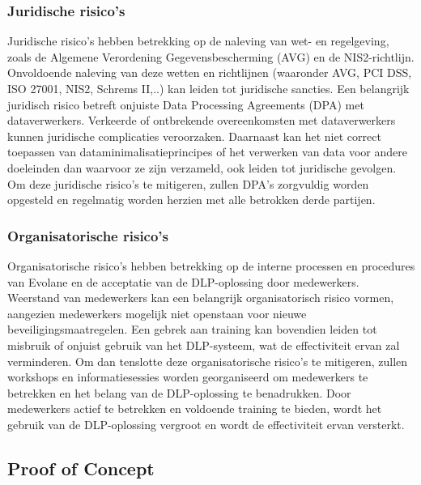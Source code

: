 \subsubsection{Juridische risico's}

Juridische risico's hebben betrekking op de naleving van wet- en regelgeving, zoals de Algemene Verordening Gegevensbescherming (AVG) en de NIS2-richtlijn.
Onvoldoende naleving van deze wetten en richtlijnen (waaronder AVG, PCI DSS, ISO 27001, NIS2, Schrems II,..) kan leiden tot juridische sancties. 
Een belangrijk juridisch risico betreft onjuiste Data Processing Agreements (DPA) met dataverwerkers. 
Verkeerde of ontbrekende overeenkomsten met dataverwerkers kunnen juridische complicaties veroorzaken. 
Daarnaast kan het niet correct toepassen van dataminimalisatieprincipes of het verwerken van data voor andere doeleinden dan waarvoor ze zijn verzameld, 
ook leiden tot juridische gevolgen. 
Om deze juridische risico's te mitigeren, zullen DPA's zorgvuldig worden opgesteld en regelmatig worden herzien met alle betrokken derde partijen. 

\subsubsection{Organisatorische risico's}

Organisatorische risico's hebben betrekking op de interne processen en procedures van Evolane en de acceptatie van de DLP-oplossing door medewerkers. 
Weerstand van medewerkers kan een belangrijk organisatorisch risico vormen, aangezien medewerkers mogelijk niet openstaan voor nieuwe beveiligingsmaatregelen. 
Een gebrek aan training kan bovendien leiden tot misbruik of onjuist gebruik van het DLP-systeem, wat de effectiviteit ervan zal verminderen. 
Om dan tenslotte deze organisatorische risico's te mitigeren, zullen workshops en informatiesessies worden georganiseerd om medewerkers te betrekken en het belang van de DLP-oplossing te benadrukken. 
Door medewerkers actief te betrekken en voldoende training te bieden, wordt het gebruik van de DLP-oplossing vergroot en wordt de effectiviteit ervan versterkt.

\subsection{Proof of Concept}%

